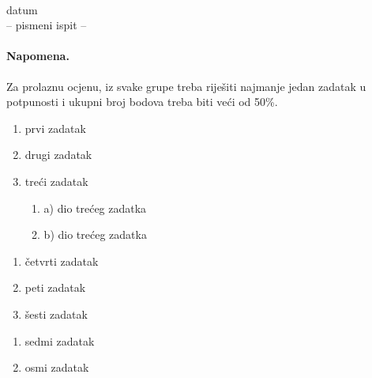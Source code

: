 \documentclass[a4paper,11pt]{article}
\begin{document}

\begin{center}
\\[5pt]
datum\\[5pt]
-- pismeni ispit --
\end{center}

\vspace{0.1cm}

\paragraph{Napomena.} Za prolaznu ocjenu, iz svake grupe treba rije\v{s}iti najmanje jedan zadatak
u potpunosti i ukupni broj bodova treba biti ve\'{c}i od 50\%.\\[0.8cm]

\noindent{}

\begin{enumerate}
\item prvi zadatak
\item drugi zadatak
\item tre\'ci zadatak
\begin{enumerate}
\item a) dio tre\'ceg zadatka
\item b) dio tre\'ceg zadatka
\end{enumerate}

\setcounter{grupe}{\value{enumi}} %
\end{enumerate}

\vspace{1cm}

\noindent{}

\begin{enumerate}
\addtocounter{enumi}{\value{grupe}} %

\item \v{c}etvrti zadatak
\item peti zadatak
\item \v{s}esti zadatak

\setcounter{grupe}{\value{enumi}} %
\end{enumerate}

\vspace{1cm}

\noindent{}

\begin{enumerate}
\addtocounter{enumi}{\value{grupe}}
\item sedmi zadatak
\item osmi zadatak
\end{enumerate}
\end{document}
